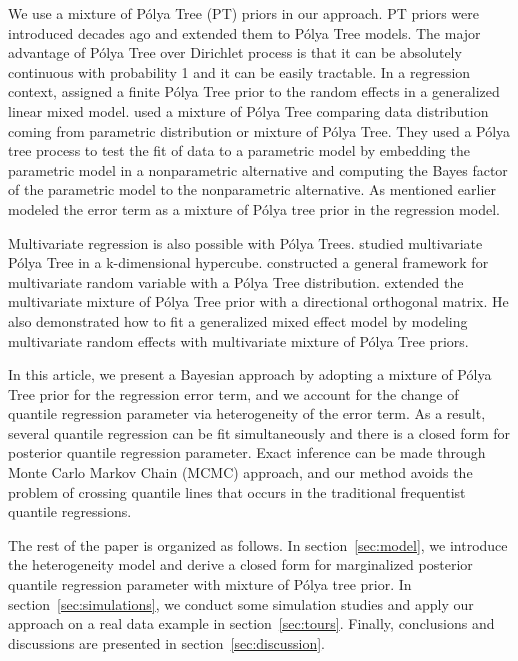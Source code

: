 \documentclass[12pt]{article}
\newcommand{\polya}{P\'{o}lya}
\begin{document}
We use a mixture of \polya{} Tree (PT) priors in our approach. PT
priors were introduced decades ago \citep{freedman1963, fabius1964,
  ferguson1974} and \citet{lavine1992, lavine1994} extended them to
\polya{} Tree models. The major advantage of \polya{} Tree over
Dirichlet process is that it can be absolutely continuous with
probability 1 and it can be easily tractable. In a regression context,
\citet{walker1997, walker1999} assigned a finite \polya{} Tree prior
to the random effects in a generalized linear mixed
model. \citet{berger2001} used a mixture of \polya{} Tree comparing
data distribution coming from parametric distribution or mixture of
\polya{} Tree. They used a \polya{} tree process to test the fit of
data to a parametric model by embedding the parametric model in a
nonparametric alternative and computing the Bayes factor of the
parametric model to the nonparametric alternative.  As mentioned
earlier \citet{hanson2002} modeled the error term as a mixture of
\polya{} tree prior in the regression model.

Multivariate regression is also possible with \polya{}
Trees. \citet{paddock1999, paddock2002} studied multivariate \polya{}
Tree in a k-dimensional hypercube. \citet{hanson2006} constructed a
general framework for multivariate random variable with a \polya{}
Tree distribution. \citet{jara2009} extended the multivariate mixture
of \polya{} Tree prior with a directional orthogonal matrix.  He also
demonstrated how to fit a generalized mixed effect model by modeling
multivariate random effects with multivariate mixture of \polya{} Tree
priors.

In this article, we present a Bayesian approach by adopting a mixture
of \polya{} Tree prior for the regression error term, and we account
for the change of quantile regression parameter via heterogeneity of
the error term. As a result, several quantile regression can be fit
simultaneously and there is a closed form for posterior quantile
regression parameter. Exact inference can be made through Monte Carlo
Markov Chain (MCMC) approach, and our method avoids the problem of
crossing quantile lines that occurs in the traditional frequentist
quantile regressions.

The rest of the paper is organized as follows. In
section~\ref{sec:model}, we introduce the heterogeneity model and
derive a closed form for marginalized posterior quantile regression
parameter with mixture of \polya{} tree prior.  In
section~\ref{sec:simulations}, we conduct some simulation studies and
apply our approach on a real data example in
section~\ref{sec:tours}. Finally, conclusions and discussions are
presented in section~\ref{sec:discussion}.
\end{document}
